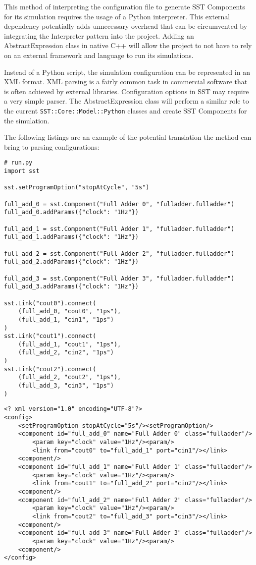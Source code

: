 This method of interpreting the configuration file to generate SST Components for its simulation requires the usage of a Python interpreter. This external dependency potentially adds unnecessary overhead that can be circumvented by integrating the Interpreter pattern into the project. Adding an AbstractExpression class in native C++ will allow the project to not have to rely on an external framework and language to run its simulations.

Instead of a Python script, the simulation configuration can be represented in an XML format. XML parsing is a fairly common task in commercial software that is often achieved by external libraries. Configuration options in SST may require a very simple parser. The AbstractExpression class will perform a similar role to the current \texttt{SST::Core::Model::Python} classes and create SST Components for the simulation.

The following listings are an example of the potential translation the method can bring to parsing configurations:
\begin{lstlisting}[style=customPython]
# run.py
import sst

sst.setProgramOption("stopAtCycle", "5s")

full_add_0 = sst.Component("Full Adder 0", "fulladder.fulladder")
full_add_0.addParams({"clock": "1Hz"})

full_add_1 = sst.Component("Full Adder 1", "fulladder.fulladder")
full_add_1.addParams({"clock": "1Hz"})

full_add_2 = sst.Component("Full Adder 2", "fulladder.fulladder")
full_add_2.addParams({"clock": "1Hz"})

full_add_3 = sst.Component("Full Adder 3", "fulladder.fulladder")
full_add_3.addParams({"clock": "1Hz"})

sst.Link("cout0").connect(
    (full_add_0, "cout0", "1ps"),
    (full_add_1, "cin1", "1ps")
)
sst.Link("cout1").connect(
    (full_add_1, "cout1", "1ps"),
    (full_add_2, "cin2", "1ps")
)
sst.Link("cout2").connect(
    (full_add_2, "cout2", "1ps"),
    (full_add_3, "cin3", "1ps")
)
\end{lstlisting}

\begin{lstlisting}[style=customXML]
<? xml version="1.0" encoding="UTF-8"?>
<config>
    <setProgramOption stopAtCycle="5s"/><setProgramOption/>
    <component id="full_add_0" name="Full Adder 0" class="fulladder"/>
        <param key="clock" value="1Hz"/><param/>
        <link from="cout0" to="full_add_1" port="cin1"/></link>
    <component/>
    <component id="full_add_1" name="Full Adder 1" class="fulladder"/>
        <param key="clock" value="1Hz"/><param/>
        <link from="cout1" to="full_add_2" port="cin2"/></link>
    <component/>
    <component id="full_add_2" name="Full Adder 2" class="fulladder"/>
        <param key="clock" value="1Hz"/><param/>
        <link from="cout2" to="full_add_3" port="cin3"/></link>
    <component/>
    <component id="full_add_3" name="Full Adder 3" class="fulladder"/>
        <param key="clock" value="1Hz"/><param/>
    <component/>
</config>
\end{lstlisting}

